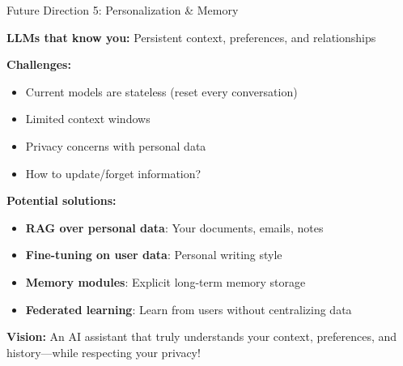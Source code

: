 \documentclass[aspectratio=169]{beamer}
\begin{document}
\begin{frame}[shrink=10]{Future Direction 5: Personalization \& Memory 💾}
\begin{futurebox}
\textbf{LLMs that know you:} Persistent context, preferences, and relationships
\end{futurebox}

\textbf{Challenges:}
\begin{itemize}\setlength{\itemsep}{0pt}
    \item Current models are stateless (reset every conversation)
    \item Limited context windows
    \item Privacy concerns with personal data
    \item How to update/forget information?
\end{itemize}

\vspace{0.5em}

\textbf{Potential solutions:}
\begin{itemize}\setlength{\itemsep}{0pt}
    \item \textbf{RAG over personal data}: Your documents, emails, notes
    \item \textbf{Fine-tuning on user data}: Personal writing style
    \item \textbf{Memory modules}: Explicit long-term memory storage
    \item \textbf{Federated learning}: Learn from users without centralizing data
\end{itemize}

\vspace{0.5em}

\textbf{Vision:} An AI assistant that truly understands your context, preferences, and history—while respecting your privacy!
\end{frame}
\end{document}
